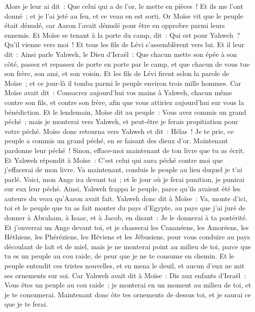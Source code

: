 \begin{multicols}{2}
Alors je leur ai dit~: Que celui qui a de l'or, le mette en pièces~! Et ils me l'ont donné~; et je l'ai jeté au feu, et ce veau en est sorti.
Or Moïse vit que le peuple était dénudé, car Aaron l'avait dénudé pour être en opprobre parmi leurs ennemis.
Et Moïse se tenant à la porte du camp, dit~: Qui est pour Yahweh~? Qu'il vienne vers moi~! Et tous les fils de Lévi s'assemblèrent vers lui.
Et il leur dit~: Ainsi parle Yahweh, le Dieu d'Israël~: Que chacun mette son épée à son côté, passez et repassez de porte en porte par le camp, et que chacun de vous tue son frère, son ami, et son voisin.
Et les fils de Lévi firent selon la parole de Moïse~; et ce jour-là il tomba parmi le peuple environ trois mille hommes.
Car Moïse avait dit~: Consacrez aujourd'hui vos mains à Yahweh, chacun même contre son fils, et contre son frère, afin que vous attiriez aujourd'hui sur vous la bénédiction.
Et le lendemain, Moïse dit au peuple~: Vous avez commis un grand péché~; mais je monterai vers Yahweh, et peut-être je ferais propitiation pour votre péché.
Moïse donc retourna vers Yahweh et dit~: Hélas~! Je te prie, ce peuple a commis un grand péché, en se faisant des dieux d'or.
Maintenant pardonne leur péché~! Sinon, efface-moi maintenant de ton livre que tu as écrit.
Et Yahweh répondit à Moïse~: C'est celui qui aura péché contre moi que j'effacerai de mon livre.
Va maintenant, conduis le peuple au lieu duquel je t'ai parlé. Voici, mon Ange ira devant toi~; et le jour où je ferai punition, je punirai sur eux leur péché.
 Ainsi, Yahweh frappa le peuple, parce qu'ils avaient été les auteurs du veau qu'Aaron avait fait.
\VerseOne{}Yahweh donc dit à Moïse~: Va, monte d'ici, toi et le peuple que tu as fait monter du pays d'Egypte, au pays que j'ai juré de donner à Abraham, à Isaac, et à Jacob, en disant~: Je le donnerai à ta postérité.
Et j'enverrai un Ange devant toi, et je chasserai les Cananéens, les Amoréens, les Héthiens, les Phéréziens, les Héviens et les Jébusiens,
pour vous conduire au pays découlant de lait et de miel, mais je ne monterai point au milieu de toi, parce que tu es un peuple au cou raide, de peur que je ne te consume en chemin.
Et le peuple entendit ces tristes nouvelles, et en mena le deuil, et aucun d'eux ne mit ses ornements sur soi.
Car Yahweh avait dit à Moïse~: Dis aux enfants d'Israël~: Vous êtes un peuple au cou raide~; je monterai en un moment au milieu de toi, et je te consumerai. Maintenant donc ôte tes ornements de dessus toi, et je saurai ce que je te ferai.

\end{multicols}
